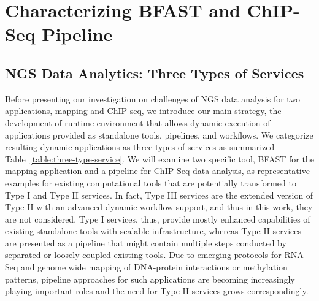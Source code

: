 \documentclass{cpeauth}
\begin{document}
\section{Characterizing BFAST and ChIP-Seq Pipeline}

\subsection{NGS Data Analytics: Three Types of Services}

Before presenting our investigation on challenges of NGS data analysis
for two applications, mapping and ChIP-seq, we introduce our main
strategy, the development of runtime environment that allows dynamic
execution of applications provided as standalone tools, pipelines, and
workflows.  We categorize resulting dynamic applications as three
types of services as summarized
Table~\ref{table:three-type-service}. We will examine two specific
tool, BFAST for the mapping application and a pipeline for ChIP-Seq
data analysis, as representative examples for existing computational
tools that are potentially transformed to Type I and Type II services.
In fact, Type III services are the extended version of Type II with an
advanced dynamic workflow support, and thus in this work, they are not
considered.  Type I services, thus, provide mostly enhanced
capabilities of existing standalone tools with scalable
infrastructure, whereas Type II services are presented as a pipeline
that might contain multiple steps conducted by separated or
loosely-coupled existing tools.  Due to emerging protocols for RNA-Seq
and genome wide mapping of DNA-protein interactions or methylation
patterns, pipeline approaches for such applications are becoming
increasingly playing important roles and the need for Type II services
grows correspondingly.

\end{document}
